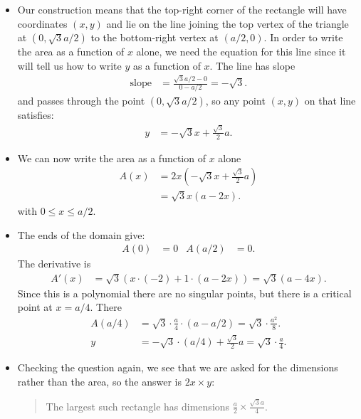 \begin{eg}
\begin{itemize}
\item Our construction means that the top-right corner of the rectangle will
have coordinates $(x,y)$ and lie on the line joining the top vertex of the
triangle at $(0,\sqrt{3}a/2)$ to the bottom-right vertex at $(a/2,0)$. In order
to write the area as a function of $x$ alone, we need the equation for this
line since it will tell us how to write $y$ as a function of $x$. The line has
slope
\begin{align*}
  \text{slope} &= \frac{\sqrt{3}a/2 - 0}{0-a/2} = -\sqrt{3}.
\end{align*}
and passes through the point $(0,\sqrt{3}a/2)$, so any point $(x,y)$ on that
line satisfies:
\begin{align*}
  y &= -\sqrt{3}x + \frac{\sqrt{3}}{2}a.
\end{align*}
\item We can now write the area as a function of $x$ alone
\begin{align*}
  A(x) &= 2x \left( -\sqrt{3}x + \frac{\sqrt{3}}{2}a \right)\\
  &= \sqrt{3} x(a-2x).
\end{align*}
with $0\leq x \leq a/2$.
\item The ends of the domain give:
\begin{align*}
  A(0) &= 0 & A(a/2) &= 0.
\end{align*}
The derivative is
\begin{align*}
  A'(x) &= \sqrt{3} \left( x \cdot (-2) + 1 \cdot (a-2x) \right) = \sqrt{3}
(a-4x).
\end{align*}
Since this is a polynomial there are no singular points, but there is a
critical point at $x=a/4$. There
\begin{align*}
  A(a/4) &= \sqrt{3} \cdot \frac{a}{4} \cdot (a - a/2) = \sqrt{3} \cdot
\frac{a^2}{8}. \\
  y &= -\sqrt{3}\cdot (a/4) + \frac{\sqrt{3}}{2} a = \sqrt{3}\cdot \frac{a}{4}.
\end{align*}
\item Checking the question again, we see that we are asked for the dimensions
rather than the area, so the answer is $2x \times y$:
\begin{quote}
 The largest such rectangle has dimensions $\frac{a}{2} \times \frac{\sqrt{3}
a}{4}$.
\end{quote}

\end{itemize}

\end{eg}


